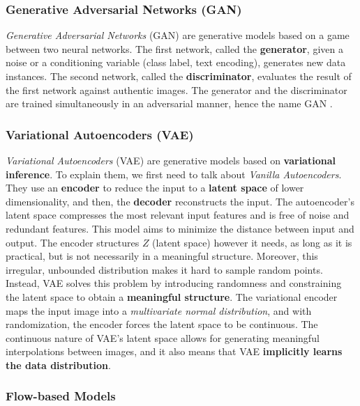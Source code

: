 \documentclass[preprint]{elsarticle}
\begin{document}
\subsubsection{Generative Adversarial Networks (GAN)}\label{sec:gan}


\emph{Generative Adversarial Networks} (GAN) \cite{goodfellow2014generative} are generative models based on a game between two neural networks. 
The first network, called the \textbf{generator}, given a noise or a conditioning variable (class label, text encoding), generates new data instances. 
The second network, called the \textbf{discriminator}, evaluates the result of the first network against authentic images.
The generator and the discriminator are trained simultaneously in an adversarial manner, hence the name GAN
\cite{weng2019gan}.

\subsubsection{Variational Autoencoders (VAE)} \label{sec:vae}


\emph{Variational Autoencoders} (VAE) \cite{kingma2022autoencoding} are generative models based on \textbf{variational inference}.
To explain them, we first need to talk about \emph{Vanilla Autoencoders}.
They use an \textbf{encoder} to reduce the input to a \textbf{latent space} of lower dimensionality, and then, the \textbf{decoder} reconstructs the input. 
The autoencoder's latent space compresses the most relevant input features and is free of noise and redundant features.
This model aims to minimize the distance between input and output. The encoder structures $Z$ (latent space) however it needs, as long as it is practical, but is not necessarily in a meaningful structure. 
Moreover, this irregular, unbounded distribution makes it hard to sample random points.
Instead, VAE solves this problem by introducing randomness and constraining the latent space to obtain a \textbf{meaningful structure}. 
The variational encoder maps the input image into a \emph{multivariate normal distribution}, and with randomization, the encoder forces the latent space to be continuous. 
The continuous nature of VAE's latent space allows for generating meaningful interpolations between images, and it also means that VAE \textbf{implicitly learns the data distribution}.

\subsubsection{Flow-based Models} \label{sec:flow}
\end{document}
